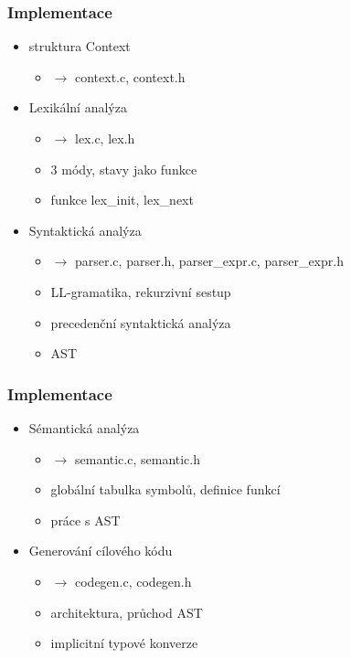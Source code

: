 \documentclass[10pt]{beamer}
\begin{document}

\begin{frame}
\frametitle{Implementace}
\begin{itemize}[<+->]
\item struktura Context
	\begin{itemize}[<2->]
	\item $\rightarrow$ context.c, context.h
	\end{itemize}
\pause
\vspace{0.2cm}
\item Lexikální analýza
	\begin{itemize}[<4->]
	\item $\rightarrow$ lex.c, lex.h
	\item 3 módy, stavy jako funkce
	\item funkce lex\_init, lex\_next
	\end{itemize}
\pause
\vspace{0.2cm}
\item Syntaktická analýza
	\begin{itemize}[<6->]
	\item $\rightarrow$ parser.c, parser.h, parser\_expr.c, parser\_expr.h
	\item LL-gramatika, rekurzivní sestup
	\item precedenční syntaktická analýza
	\item AST
	\end{itemize}
\end{itemize}
\end{frame}

\begin{frame}
\frametitle{Implementace}
\begin{itemize}[<+->]
\item Sémantická analýza
	\begin{itemize}[<2->]
	\item $\rightarrow$ semantic.c, semantic.h
	\item globální tabulka symbolů, definice funkcí
	\item práce s AST
	\end{itemize}
\pause
\vspace{0.2cm}
\item Generování cílového kódu
	\begin{itemize}[<4->]
	\item $\rightarrow$ codegen.c, codegen.h
	\item architektura, průchod AST
	\item implicitní typové konverze
	\end{itemize}
\end{itemize}
\end{frame}
\end{document}
